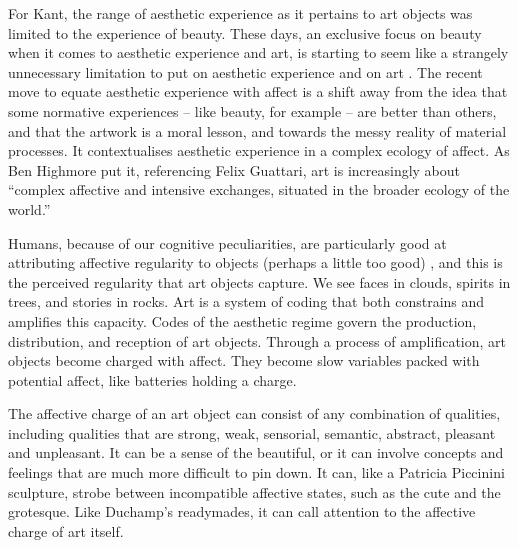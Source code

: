 \documentclass[letterpaper]{article}
\begin{document}
    For Kant, the range of aesthetic experience as it pertains to art objects was limited to the experience of beauty. These days, an exclusive focus on beauty when it comes to aesthetic experience and art, is starting to seem like a strangely unnecessary limitation to put on aesthetic experience and on art \citep[pp.121-122]{HighmoreBttrAftrTst2010}. The recent move to equate aesthetic experience with affect is a shift away from the idea that some normative experiences – like beauty, for example – are better than others, and that the artwork is a moral lesson, and towards the messy reality of material processes. It contextualises aesthetic experience in a complex ecology of affect. As Ben Highmore put it, referencing Felix Guattari, art is increasingly about “complex affective and intensive exchanges, situated in the broader ecology of the world.” \citep[p.155]{HighmoreBttrAftrTst2010}

    Humans, because of our cognitive peculiarities, are particularly good at attributing affective regularity to objects (perhaps a little too good) \citep{FristonThFrEnrgPrncpl2010} \citep{DeaconTheSymbolicSpecies1998}, and this is the perceived regularity that art objects capture. We see faces in clouds, spirits in trees, and stories in rocks. Art is a system of coding that both constrains and amplifies this capacity. Codes of the aesthetic regime govern the production, distribution, and reception of art objects. Through a process of amplification, art objects become charged with affect. They become slow variables packed with potential affect, like batteries holding a charge.

    The affective charge of an art object can consist of any combination of qualities, including qualities that are strong, weak, sensorial, semantic, abstract, pleasant and unpleasant. It can be a sense of the beautiful, or it can involve concepts and feelings that are much more difficult to pin down. It can, like a Patricia Piccinini sculpture, strobe between incompatible affective states, such as the cute and the grotesque. Like Duchamp's readymades, it can call attention to the affective charge of art itself.
\end{document}
